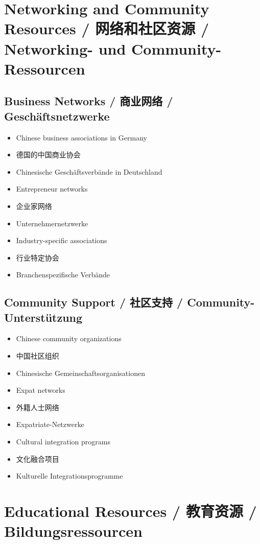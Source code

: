 \section{Networking and Community Resources / 网络和社区资源 / Networking- und Community-Ressourcen}

\subsection{Business Networks / 商业网络 / Geschäftsnetzwerke}
\begin{itemize}
    \item Chinese business associations in Germany
    \item 德国的中国商业协会
    \item Chinesische Geschäftsverbände in Deutschland
    \item Entrepreneur networks
    \item 企业家网络
    \item Unternehmernetzwerke
    \item Industry-specific associations
    \item 行业特定协会
    \item Branchenspezifische Verbände
\end{itemize}

\subsection{Community Support / 社区支持 / Community-Unterstützung}
\begin{itemize}
    \item Chinese community organizations
    \item 中国社区组织
    \item Chinesische Gemeinschaftsorganisationen
    \item Expat networks
    \item 外籍人士网络
    \item Expatriate-Netzwerke
    \item Cultural integration programs
    \item 文化融合项目
    \item Kulturelle Integrationsprogramme
\end{itemize}

\section{Educational Resources / 教育资源 / Bildungsressourcen}

